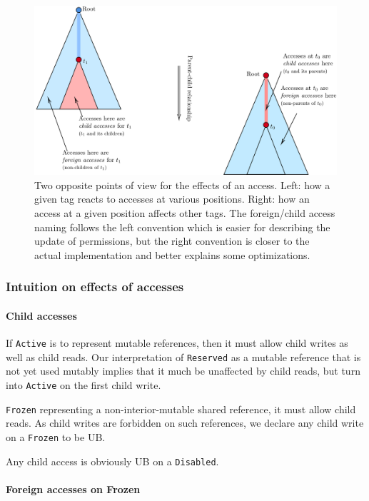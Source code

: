 \documentclass[a4paper,11pt]{article}
\theoremstyle{plain}
\theoremstyle{definition}
\theoremstyle{remark}
\newcommand{\tperm}[1]{\texttt{#1}}
\begin{document}
\begin{figure}
    \includegraphics[width=\textwidth]{../figs/child-or-foreign.pdf}
    \caption{Two opposite points of view for the effects of an access.
    Left: how a given tag reacts to accesses at various positions.
    Right: how an access at a given position affects other tags.
    The foreign/child access naming follows the left convention which is easier
    for describing the update of permissions, but the right convention is closer
    to the actual implementation and better explains some optimizations.}
    \label{fig:access-pov}
\end{figure}

\subsubsection{Intuition on effects of accesses}
\label{sec:transitions-basic}

\paragraph*{Child accesses}

If \tperm{Active} is to represent mutable references, then it must allow child writes
as well as child reads. Our interpretation of \tperm{Reserved} as a mutable reference
that is not yet used mutably implies that it much be unaffected by child reads,
but turn into \tperm{Active} on the first child write.

\tperm{Frozen} representing a non-interior-mutable shared reference, it must allow
child reads. As child writes are forbidden on such references, we declare any
child write on a \tperm{Frozen} to be UB.

Any child access is obviously UB on a \tperm{Disabled}.

\paragraph*{Foreign accesses on Frozen}
\end{document}
